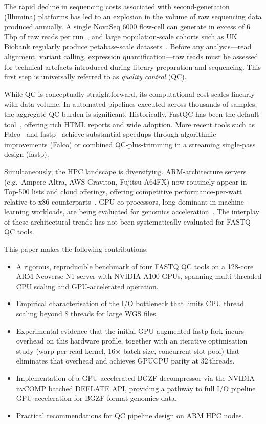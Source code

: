 \documentclass[a4paper,12pt]{article}
\begin{document}
The rapid decline in sequencing costs associated with second-generation
(Illumina) platforms has led to an explosion in the volume of raw sequencing
data produced annually.  A single NovaSeq 6000 flow-cell can generate in excess
of 6\,Tbp of raw reads per run~\cite{Illumina2023NovaSeq}, and large
population-scale cohorts such as UK Biobank regularly produce petabase-scale
datasets~\cite{Bycroft2018UKBiobank}.  Before any analysis---read alignment,
variant calling, expression quantification---raw reads must be assessed for
technical artefacts introduced during library preparation and sequencing.  This
first step is universally referred to as \emph{quality control} (QC).

While QC is conceptually straightforward, its computational cost scales linearly
with data volume.  In automated pipelines executed across thousands of samples,
the aggregate QC burden is significant.  Historically, FastQC has been the
default tool~\cite{Andrews2010FastQC}, offering rich HTML reports and wide
adoption.  More recent tools such as Falco~\cite{deSenaBrandine2021Falco} and
fastp~\cite{Chen2018fastp} achieve substantial speedups through algorithmic
improvements (Falco) or combined QC-plus-trimming in a streaming single-pass
design (fastp).

Simultaneously, the HPC landscape is diversifying.  ARM-architecture servers
(e.g.\ Ampere Altra, AWS Graviton, Fujitsu A64FX) now routinely appear in
Top-500 lists and cloud offerings, offering competitive performance-per-watt
relative to x86 counterparts~\cite{Ditzel2020ARM}.  GPU co-processors, long
dominant in machine-learning workloads, are being evaluated for genomics
acceleration~\cite{Houtgast2018GPU, Shajii2016Seq}.  The interplay of these
architectural trends has not been systematically evaluated for FASTQ QC tools.

This paper makes the following contributions:
\begin{itemize}
  \item A rigorous, reproducible benchmark of four FASTQ QC tools on a
    128-core ARM Neoverse N1 server with NVIDIA A100 GPUs, spanning
    multi-threaded CPU scaling and GPU-accelerated operation.
  \item Empirical characterisation of the I/O bottleneck that limits CPU
    thread scaling beyond 8 threads for large WGS files.
  \item Experimental evidence that the initial GPU-augmented fastp fork
    incurs overhead on this hardware profile, together with an iterative
    optimisation study (warp-per-read kernel, 16$\times$ batch size,
    concurrent slot pool) that eliminates that overhead and achieves
    GPU\/CPU parity at 32\,threads.
  \item Implementation of a GPU-accelerated BGZF decompressor via the
    NVIDIA nvCOMP batched DEFLATE API, providing a pathway to full I/O
    pipeline GPU acceleration for BGZF-format genomics data.
  \item Practical recommendations for QC pipeline design on ARM HPC nodes.
\end{itemize}
\end{document}
